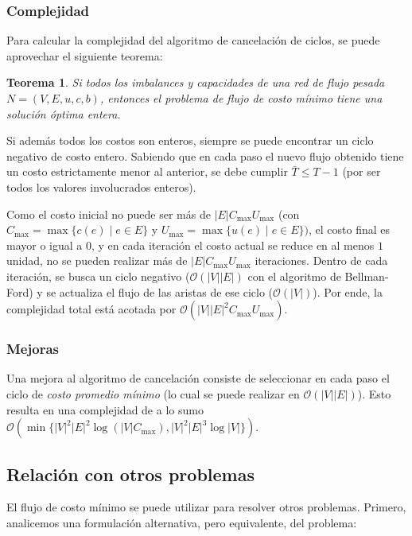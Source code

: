 \documentclass[a4paper]{report}
\newcommand{\BigO}[1]{\ensuremath{\mathcal{O}(#1)}}
\newtheorem*{theorem*}{Teorema}
\begin{document}
\subsubsection{Complejidad}

Para calcular la complejidad del algoritmo de cancelación de ciclos, se puede aprovechar el siguiente teorema:

\begin{theorem*}
    Si todos los imbalances y capacidades de una red de flujo pesada $N = (V, E, u, c, b)$, entonces el problema de flujo de costo mínimo tiene una solución óptima entera.
\end{theorem*}

Si además todos los costos son enteros, siempre se puede encontrar un ciclo negativo de costo entero. Sabiendo que en cada paso el nuevo flujo obtenido tiene un costo estrictamente menor al anterior, se debe cumplir $\bar{T} \leq T - 1$ (por ser todos los valores involucrados enteros).

Como el costo inicial no puede ser más de $|E| C_{\max} U_{\max}$ (con $C_{\max} = \max{\{c(e) \mid e \in E\}}$ y $U_{\max} = \max{\{u(e) \mid e \in E\}})$, el costo final es mayor o igual a $0$, y en cada iteración el costo actual se reduce en al menos $1$ unidad, no se pueden realizar más de $|E| C_{\max} U_{\max}$ iteraciones. Dentro de cada iteración, se busca un ciclo negativo (\BigO{|V||E|} con el algoritmo de Bellman-Ford) y se actualiza el flujo de las aristas de ese ciclo (\BigO{|V|}). Por ende, la complejidad total está acotada por \BigO{|V||E|^2 C_{\max} U_{\max}}.

\subsubsection{Mejoras}

Una mejora al algoritmo de cancelación consiste de seleccionar en cada paso el ciclo de \textit{costo promedio mínimo} (lo cual se puede realizar en \BigO{|V||E|}). Esto resulta en una complejidad de a lo sumo \BigO{\min{\{|V|^2|E|^2\log{(|V|C_{\max})}, |V|^2|E|^3 \log{|V|}\}}}.

\subsection{Relación con otros problemas}

El flujo de costo mínimo se puede utilizar para resolver otros problemas. Primero, analicemos una formulación alternativa, pero equivalente, del problema:
\end{document}
